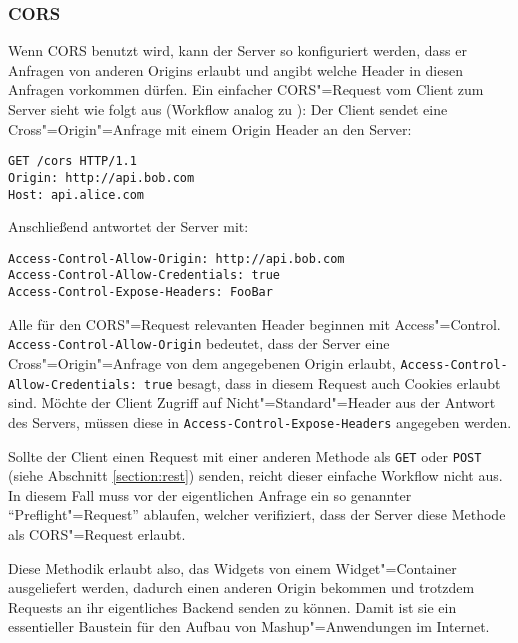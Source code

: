 \subsubsection*{\ac{CORS}}
Wenn \acl{CORS} benutzt wird, kann der Server so konfiguriert werden, dass er Anfragen von anderen Origins erlaubt und angibt welche Header in diesen Anfragen vorkommen dürfen. Ein einfacher \ac{CORS}"=Request vom Client zum Server sieht wie folgt aus (Workflow analog zu \cite{Hossain2012}):
Der Client sendet eine Cross"=Origin"=Anfrage mit einem Origin Header an den Server:
\begin{lstlisting}
GET /cors HTTP/1.1
Origin: http://api.bob.com
Host: api.alice.com
\end{lstlisting}
Anschließend antwortet der Server mit:
\begin{lstlisting}
Access-Control-Allow-Origin: http://api.bob.com
Access-Control-Allow-Credentials: true
Access-Control-Expose-Headers: FooBar
\end{lstlisting}
Alle für den \ac{CORS}"=Request relevanten Header beginnen mit Access"=Control.\\ \texttt{Access\allowbreak -Control\allowbreak -Allow\allowbreak -Origin} bedeutet, dass der Server eine Cross"=Origin"=Anfrage von dem angegebenen Origin erlaubt, \texttt{Access\allowbreak -Control\allowbreak -Allow\allowbreak -Credentials: true} besagt, dass in diesem Request auch Cookies erlaubt sind. Möchte der Client Zugriff auf Nicht"=Standard"=Header aus der Antwort des Servers, müssen diese in \texttt{Access\allowbreak -Control\allowbreak -Expose\allowbreak -Headers} angegeben werden.

Sollte der Client einen Request mit einer anderen Methode als \texttt{GET} oder \texttt{POST} (siehe Abschnitt \ref{section:rest}) senden, reicht dieser einfache Workflow nicht aus. In diesem Fall muss vor der eigentlichen Anfrage ein so genannter "`Preflight"=Request"' ablaufen, welcher verifiziert, dass der Server diese Methode als \ac{CORS}"=Request erlaubt.

Diese Methodik erlaubt also, das Widgets von einem Widget"=Container ausgeliefert werden, dadurch einen anderen Origin bekommen und trotzdem Requests an ihr eigentliches Backend senden zu können. Damit ist sie ein essentieller Baustein für den Aufbau von Mashup"=Anwendungen im Internet.

